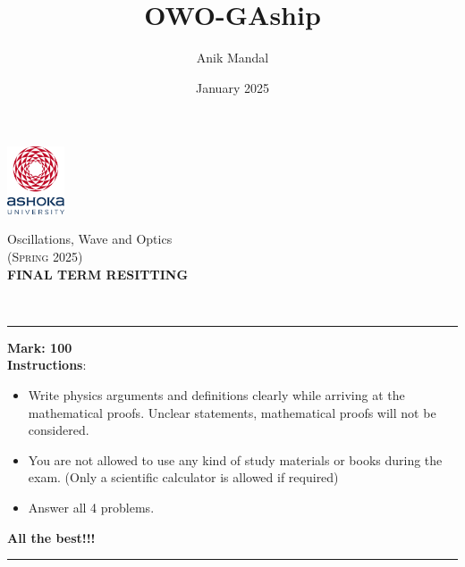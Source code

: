 \documentclass[12pt, a4paper]{article}
\title{OWO-GAship}
\author{Anik Mandal}
\date{January 2025}
\begin{document}
\begin{minipage}[t][][c]{0.1\textwidth}
    \begin{flushleft}
        \includegraphics[height=2cm]{tex-resources/Ashoka Logo.png}
    \end{flushleft}
\end{minipage}
\begin{minipage}[t][][c]{0.85\textwidth}
    \begin{center}
        {\LARGE Oscillations, Wave and Optics}\\ \vspace{0.5em}
        \textsc{(Spring 2025)}\\
        \vspace{1em}
        \textbf{\Large FINAL TERM RESITTING} \\
    \end{center}
\end{minipage}
\vspace{20pt}\\
\rule[0em]{\textwidth}{0.75pt}

\hfill
{}\hfill
\textbf{\large 
Mark: 100}\\

\textbf{Instructions}:
\begin{itemize}
    \item Write physics arguments and definitions clearly while arriving at the mathematical proofs.
    Unclear statements, mathematical proofs will not be considered. 
    \item You are not allowed to use any kind of study materials or books during the exam.
    (Only a scientific calculator is allowed if required)
    \item Answer all 4 problems.
\end{itemize}
\begin{center}
    \textbf{All the best!!!}
\end{center}
\rule[0em]{\textwidth}{1.75pt}
\vspace{-1cm}

\justifying
\end{document}
